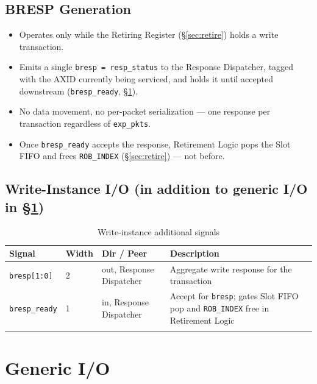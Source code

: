 \subsection{BRESP Generation}
\begin{itemize}[noitemsep]
  \item Operates only while the Retiring Register (\S\ref{sec:retire}) holds a write transaction.
  \item Emits a single \texttt{bresp = resp\_status} to the Response Dispatcher, tagged with the AXID currently being serviced, and holds it until accepted downstream (\texttt{bresp\_ready}, \S\ref{sec:io}).
  \item No data movement, no per-packet serialization --- one response per transaction regardless of \texttt{exp\_pkts}.
  \item Once \texttt{bresp\_ready} accepts the response, Retirement Logic pops the Slot FIFO and frees \texttt{ROB\_INDEX} (\S\ref{sec:retire}) --- not before.
\end{itemize}

\subsection*{Write-Instance I/O (in addition to generic I/O in \S\ref{sec:io})}
\begin{longtable}{p{3cm}p{1cm}p{3cm}p{7cm}}
\toprule
\textbf{Signal} & \textbf{Width} & \textbf{Dir / Peer} & \textbf{Description} \\
\midrule
\texttt{bresp[1:0]} & 2 & out, Response Dispatcher & Aggregate write response for the transaction \\
\texttt{bresp\_ready} & 1 & in, Response Dispatcher & Accept for \texttt{bresp}; gates Slot FIFO pop and \texttt{ROB\_INDEX} free in Retirement Logic \\
\bottomrule
\caption{Write-instance additional signals}
\end{longtable}

\section{Generic I/O}
\label{sec:io}

